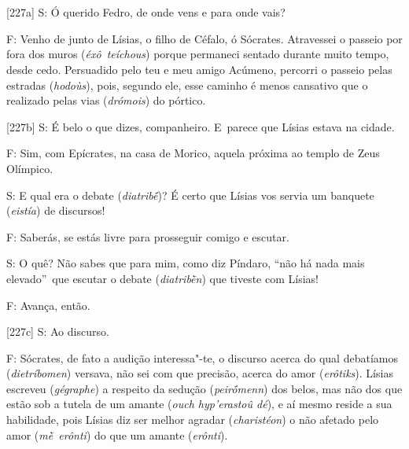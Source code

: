 
\chapter{}



[227a] S: Ó querido Fedro, de onde vens e para onde vais?

 

F: Venho de junto de Lísias, o filho de Céfalo, ó Sócrates. Atravessei o
passeio por fora dos muros (\emph{éxô}~\emph{teíchous}) porque permaneci
sentado durante muito tempo, desde cedo. Persuadido pelo teu e meu amigo
Acúmeno, percorri o passeio pelas estradas (\emph{hodoùs}), pois,
segundo ele, esse caminho é menos cansativo que o realizado pelas vias
(\emph{drómois}) do pórtico.

 

[227b] S: É belo o que dizes, companheiro. E~parece que Lísias estava
na cidade.

 

F: Sim, com Epícrates, na casa de Morico, aquela próxima ao templo de
Zeus Olímpico.

 

S: E qual era o debate (\emph{diatribḗ})? É certo que Lísias vos servia
um banquete (\emph{eistía}) de discursos!

 

F: Saberás, se estás livre para prosseguir comigo e escutar.

 

S: O quê? Não sabes que para mim, como diz Píndaro, ``não há nada mais
elevado''~que escutar o debate (\emph{diatribḕn}) que tiveste com
Lísias!

 

F: Avança, então.

 

[227c] S: Ao discurso.

 

F: Sócrates, de fato a audição interessa"-te, o discurso acerca do qual
debatíamos (\emph{dietríbomen}) versava, não sei com que precisão,
acerca do amor (\emph{erôtiks}). Lísias escreveu (\emph{gégraphe}) a
respeito da sedução (\emph{peirṓmenn}) dos belos, mas não dos que estão
sob a tutela de um amante (\emph{ouch hyp'erastoû dé}), e aí mesmo
reside a sua habilidade, pois Lísias diz ser melhor agradar
(\emph{charistéon}) o não afetado pelo amor (\emph{mḕ~erônti}) do que um
amante (\emph{erônti}).

 

